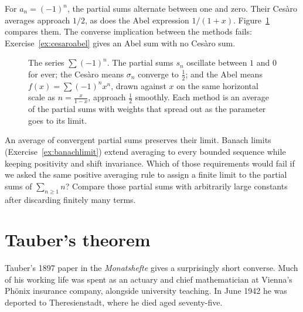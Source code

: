\begin{example}\label{ex:gregoryseries}
For $a_n=(-1)^n$, the partial sums alternate between one and zero. Their Ces\`aro averages approach $1/2$, as does the Abel expression $1/(1+x)$. Figure~\ref{fig:abelmeans} compares them. The converse implication between the methods fails: Exercise~\ref{ex:cesaroabel} gives an Abel sum with no Ces\`aro sum.
\end{example}
\begin{figure}[ht]
\centering
{}
\caption{The series $\sum(-1)^n$. The partial sums $s_n$ oscillate between $1$ and $0$ for ever; the Ces\`aro means $\sigma_n$ converge to $\frac12$;
and the Abel means $f(x)=\sum(-1)^nx^n$, drawn against $x$ on the same horizontal scale as $n=\frac x{1-x}$, approach $\frac12$ smoothly. Each method
is an average of the partial sums with weights that spread out as the parameter goes to its limit.}
\label{fig:abelmeans}
\end{figure}

\begin{think}
An average of convergent partial sums preserves their limit. Banach limits (Exercise~\ref{ex:banachlimit}) extend averaging to every bounded sequence while keeping positivity and shift invariance. Which of those requirements would fail if we asked the same positive averaging rule to assign a finite limit to the partial sums of $\sum_{n\ge1}n$? Compare those partial sums with arbitrarily large constants after discarding finitely many terms.
\end{think}

\section{Tauber's theorem}

Tauber's 1897 paper in the \emph{Monatshefte} gives a surprisingly short converse. Much of his working life was spent as an actuary and chief mathematician at Vienna's Ph\"onix insurance company, alongside university teaching. In June 1942 he was deported to Theresienstadt, where he died aged seventy-five.



